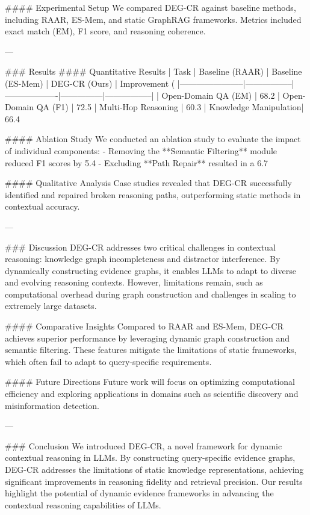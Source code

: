 #### Experimental Setup
We compared DEG-CR against baseline methods, including RAAR, ES-Mem, and static GraphRAG frameworks. Metrics included exact match (EM), F1 score, and reasoning coherence.

---

### Results
#### Quantitative Results
| Task                  | Baseline (RAAR) | Baseline (ES-Mem) | DEG-CR (Ours) | Improvement (%
|-----------------------|-----------------|-------------------|---------------|-----------------|
| Open-Domain QA (EM)   | 68.2%
| Open-Domain QA (F1)   | 72.5%
| Multi-Hop Reasoning   | 60.3%
| Knowledge Manipulation| 66.4%

#### Ablation Study
We conducted an ablation study to evaluate the impact of individual components:
- Removing the **Semantic Filtering** module reduced F1 scores by 5.4%
- Excluding **Path Repair** resulted in a 6.7%

#### Qualitative Analysis
Case studies revealed that DEG-CR successfully identified and repaired broken reasoning paths, outperforming static methods in contextual accuracy.

---

### Discussion
DEG-CR addresses two critical challenges in contextual reasoning: knowledge graph incompleteness and distractor interference. By dynamically constructing evidence graphs, it enables LLMs to adapt to diverse and evolving reasoning contexts. However, limitations remain, such as computational overhead during graph construction and challenges in scaling to extremely large datasets.

#### Comparative Insights
Compared to RAAR and ES-Mem, DEG-CR achieves superior performance by leveraging dynamic graph construction and semantic filtering. These features mitigate the limitations of static frameworks, which often fail to adapt to query-specific requirements.

#### Future Directions
Future work will focus on optimizing computational efficiency and exploring applications in domains such as scientific discovery and misinformation detection.

---

### Conclusion
We introduced DEG-CR, a novel framework for dynamic contextual reasoning in LLMs. By constructing query-specific evidence graphs, DEG-CR addresses the limitations of static knowledge representations, achieving significant improvements in reasoning fidelity and retrieval precision. Our results highlight the potential of dynamic evidence frameworks in advancing the contextual reasoning capabilities of LLMs.

